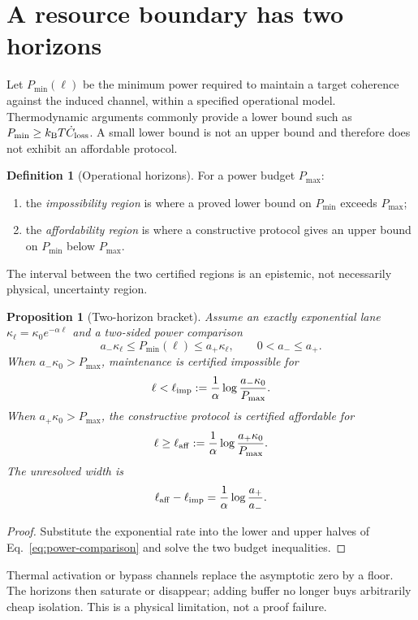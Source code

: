 \documentclass[11pt,a4paper]{article}
\newtheorem{proposition}[theorem]{Proposition}
\theoremstyle{definition}
\newtheorem{definition}[theorem]{Definition}
\theoremstyle{remark}
\newcommand{\kB}{k_{\mathrm B}}
\begin{document}
\section{A resource boundary has two horizons}
\label{sec:horizons}

Let $P_{\min}(\ell)$ be the minimum power required to maintain a target
coherence against the induced channel, within a specified operational model.
Thermodynamic arguments commonly provide a lower bound such as
$P_{\min}\geq\kB T\dot C_{\rm loss}$.  A small lower bound is not an upper
bound and therefore does not exhibit an affordable protocol.

\begin{definition}[Operational horizons]
For a power budget $P_{\max}$:
\begin{enumerate}
  \item the \emph{impossibility region} is where a proved lower bound on
  $P_{\min}$ exceeds $P_{\max}$;
  \item the \emph{affordability region} is where a constructive protocol gives
  an upper bound on $P_{\min}$ below $P_{\max}$.
\end{enumerate}
The interval between the two certified regions is an epistemic, not
necessarily physical, uncertainty region.
\end{definition}

\begin{proposition}[Two-horizon bracket]
\label{prop:horizon-bracket}
Assume an exactly exponential lane
$\kappa_\ell=\kappa_0e^{-\alpha\ell}$ and a two-sided power comparison
\[
  a_-\kappa_\ell\leq P_{\min}(\ell)\leq a_+\kappa_\ell,
  \qquad 0<a_-\leq a_+.
  \label{eq:power-comparison}
\]
When $a_-\kappa_0>P_{\max}$, maintenance is certified impossible for
\[
  \ell<\ell_{\rm imp}
  :=\frac1\alpha\log\frac{a_-\kappa_0}{P_{\max}}.
\]
When $a_+\kappa_0>P_{\max}$, the constructive protocol is certified affordable
for
\[
  \ell\geq\ell_{\rm aff}
  :=\frac1\alpha\log\frac{a_+\kappa_0}{P_{\max}}.
\]
The unresolved width is
\[
  \ell_{\rm aff}-\ell_{\rm imp}
  =\frac1\alpha\log\frac{a_+}{a_-}.
  \label{eq:horizon-width}
\]
\end{proposition}

\begin{proof}
Substitute the exponential rate into the lower and upper halves of
Eq.~\eqref{eq:power-comparison} and solve the two budget inequalities.
\end{proof}

Thermal activation or bypass channels replace the asymptotic zero by a floor.
The horizons then saturate or disappear; adding buffer no longer buys
arbitrarily cheap isolation.  This is a physical limitation, not a proof
failure.
\end{document}
